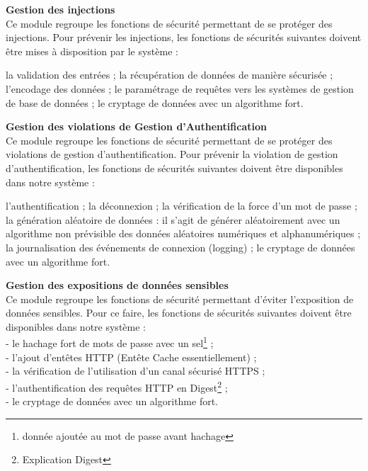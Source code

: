 \textbf{\RIGHTarrow Gestion des injections}\\
Ce module regroupe les fonctions de sécurité permettant de se protéger des injections. Pour prévenir les injections, les fonctions de sécurités suivantes doivent être mises à disposition par le système : 
\begin{itemize}
	\itemcheck la validation des entrées ; 
	\itemcheck la récupération de données de manière sécurisée ; 
	\itemcheck l’encodage des données ; 
	\itemcheck le paramétrage de requêtes vers les systèmes de gestion de base de données ; 
	\itemcheck le cryptage de données avec un algorithme fort.\\
\end{itemize}

\textbf{\RIGHTarrow Gestion des violations de Gestion d’Authentification}\\
Ce module regroupe les fonctions de sécurité permettant de se protéger des violations de gestion d'authentification. Pour prévenir la violation de gestion d'authentification, les fonctions de sécurités suivantes doivent être disponibles dans notre système :
 \begin{itemize}
 	\itemcheck l'authentification ;
 	\itemcheck la déconnexion ;
 	\itemcheck la vérification de la force d'un mot de passe ; 
 	\itemcheck la génération aléatoire de données : il s'agit de générer aléatoirement avec un algorithme non prévisible des données aléatoires numériques et alphanumériques ; 
 	\itemcheck la journalisation des événements de connexion (logging) ; 
 	\itemcheck le cryptage de données avec un algorithme fort.\\
 \end{itemize}


\textbf{\RIGHTarrow Gestion des expositions de données sensibles}\\
Ce module regroupe les fonctions de sécurité permettant d'éviter l'exposition de données sensibles. Pour ce faire, les fonctions de sécurités suivantes doivent être disponibles dans notre système : \\
- le hachage fort de mots de passe avec un sel\footnote{donnée ajoutée au mot de passe avant hachage} ; \\
- l'ajout d'entêtes HTTP (Entête Cache essentiellement) ; \\
- la vérification de l'utilisation d'un canal sécurisé HTTPS ; \\
- l'authentification des requêtes HTTP en Digest\footnote{Explication Digest} ; \\
- le cryptage de données avec un algorithme fort.\\

